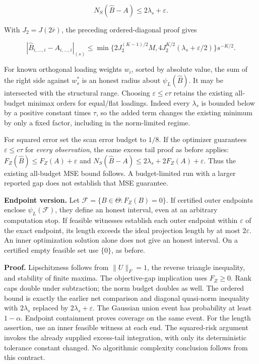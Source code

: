 \documentclass[
  10pt,
]{article}
\begin{document}
\[N_S(\widehat B-A)\le 2\lambda_s+\varepsilon.\]

With \(J_2=J(2\bar r)\), the preceding ordered-diagonal proof gives

\[|\widehat B_{i,\ldots,i}-A_{i,\ldots,i}|_{(s)}
\le \min\{2J_2^{(K-1)/2}M,
4J_2^{K/2}(\lambda_s+\varepsilon/2)\}s^{-K/2}.\]

For known orthogonal loading weights \(w_i\), sorted by absolute value,
the sum of the right side against \(w_s^*\) is an honest radius about
\(\psi_L(\widehat B)\). It may be intersected with the structural range.
Choosing \(\varepsilon\le c\tau\) retains the existing all-budget
minimax orders for equal/flat loadings. Indeed every \(\lambda_s\) is
bounded below by a positive constant times \(\tau\), so the added term
changes the existing minimum by only a fixed factor, including in the
norm-limited regime.

For squared error set the scan error budget to \(1/8\). If the optimizer
guarantees \(\varepsilon\le c\tau\) for \emph{every observation}, the
same excess tail proof as before applies:
\(F_Z(\widehat B)\le F_Z(A)+\varepsilon\) and
\(N_S(\widehat B-A)\le2\lambda_s+2F_Z(A)+\varepsilon\). Thus the
existing all-budget MSE bound follows. A budget-limited run with a
larger reported gap does not establish that MSE guarantee.

\textbf{Endpoint version.} Let \(\mathcal F=\{B\in\Theta:F_Z(B)=0\}\).
If certified outer endpoints enclose \(\psi_L(\mathcal F)\), they define
an honest interval, even at an arbitrary computation stop. If feasible
witnesses establish each outer endpoint within \(\varepsilon\) of the
exact endpoint, its length exceeds the ideal projection length by at
most \(2\varepsilon\). An inner optimization solution alone does not
give an honest interval. On a certified empty feasible set use
\(\{0\}\), as before.

\textbf{Proof.} Lipschitzness follows from \(\|U\|_F=1\), the reverse
triangle inequality, and stability of finite maxima. The objective-gap
implication uses \(F_Z\ge0\). Rank caps double under subtraction; the
norm budget doubles as well. The ordered bound is exactly the earlier
net comparison and diagonal quasi-norm inequality with \(2\lambda_s\)
replaced by \(2\lambda_s+\varepsilon\). The Gaussian union event has
probability at least \(1-\alpha\). Endpoint containment proves coverage
on the same event. For the length assertion, use an inner feasible
witness at each end. The squared-risk argument invokes the already
supplied excess-tail integration, with only its deterministic tolerance
constant changed. No algorithmic complexity conclusion follows from this
contract.
\end{document}
